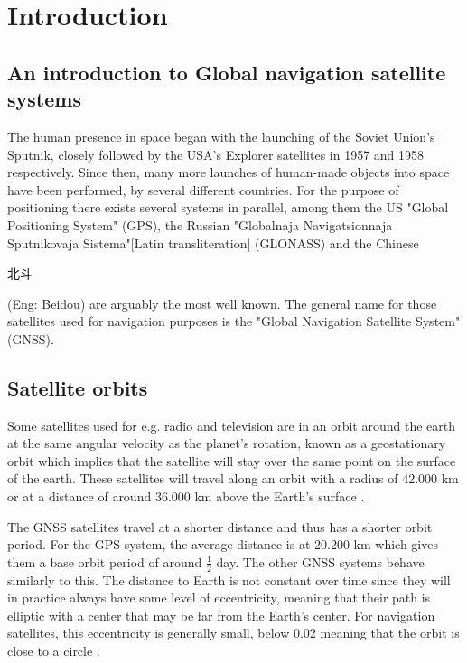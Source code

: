 

\chapter{Introduction}
\section{An introduction to Global navigation satellite systems}
The human presence in space began with the launching of the Soviet Union's Sputnik, closely followed by the USA's Explorer satellites in 1957 and 1958 respectively. Since then, many more launches of human-made objects into space have been performed, by several different countries. For the purpose of positioning there exists several systems in parallel, among them the US "Global Positioning System" (GPS), the Russian "Globalnaja Navigatsionnaja Sputnikovaja Sistema"[Latin transliteration] (GLONASS) and the Chinese \begin{CJK}{UTF8}{gbsn}北斗
\end{CJK}(Eng: Beidou) are arguably the most well known. The general name for those satellites used for navigation purposes is the "Global Navigation Satellite System" (GNSS).
\section{Satellite orbits}
Some satellites used for e.g. radio and television are in an orbit around the earth at the same angular velocity as the planet's rotation, known as a geostationary orbit which implies that the satellite will stay over the same point on the surface of the earth. These satellites will travel along an orbit with a radius of 42.000 km or at a distance of around 36.000 km above the Earth's surface \cite{soop1994handbook}. 
\par
The GNSS satellites travel at a shorter distance and thus has a shorter orbit period. For the GPS system, the average distance is at 20.200 km which gives them a base orbit period of around $\frac{1}{2}$ day. The other GNSS systems behave similarly to this. The distance to Earth is not constant over time since they will in practice always have some level of eccentricity, meaning that their path is elliptic with a center that may be far from the Earth's center. For navigation satellites, this eccentricity is generally small, below 0.02 meaning that the orbit is close to a circle \cite{Jeffrey}.

